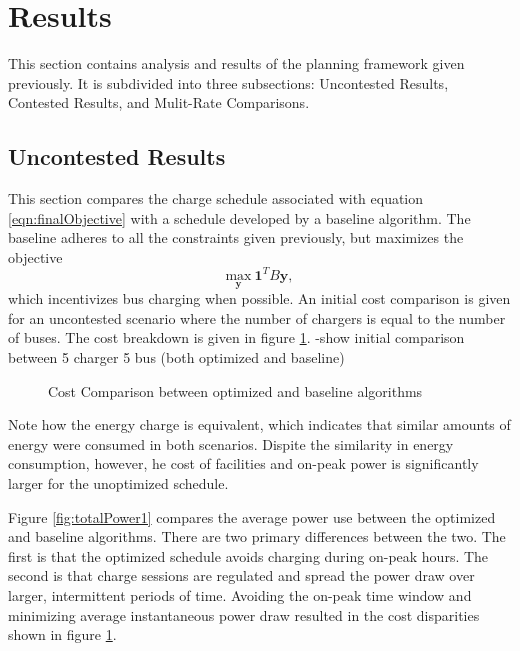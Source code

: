 \section{Results}
This section contains analysis and results of the planning framework given previously. It is subdivided into three subsections: Uncontested Results, Contested Results, and Mulit-Rate Comparisons.
\subsection{Uncontested Results}
This section compares the charge schedule associated with equation \ref{eqn:finalObjective} with a schedule developed by a baseline algorithm.  The baseline adheres to all the constraints given previously, but maximizes the objective 
\begin{equation}
	\underset{\mathbf{y}}{\text{max}} \ \mathbf{1}^TB\mathbf{y},
\end{equation}
which incentivizes bus charging when possible. An initial cost comparison is given for an uncontested scenario where the number of chargers is equal to the number of buses. The cost breakdown is given in figure \ref{fig:costComparison}.
-show initial comparison between 5 charger 5 bus (both optimized and baseline)
\begin{figure}
	\centering
	\caption{Cost Comparison between optimized and baseline algorithms}
	\label{fig:costComparison}
\end{figure}
\par Note how the energy charge is equivalent, which indicates that similar amounts of energy were consumed in both scenarios. Dispite the similarity in energy consumption, however, he cost of facilities and on-peak power is  significantly larger for the unoptimized schedule. 
\par Figure \ref{fig:totalPower1} compares the average power use between the optimized and baseline algorithms. There are two primary differences between the two. The first is that the optimized schedule avoids charging during on-peak hours.  The second is that charge sessions are regulated and spread the power draw over larger, intermittent periods of time. Avoiding the on-peak time window and minimizing average instantaneous power draw resulted in the cost disparities shown in figure \ref{fig:costComparison}.

